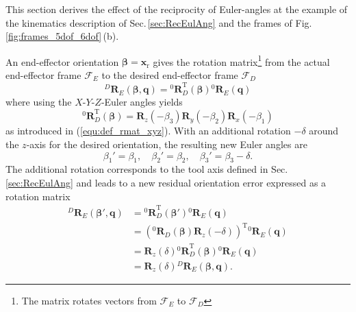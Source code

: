 \documentclass[robotics,article,submit,moreauthors,pdftex]{Definitions/mdpi}
\newcommand{\bm}[1]{\boldsymbol{#1}}
\newcommand{\rotmat}[2]{{{ }^{#1}\boldsymbol{R}}_{#2}}
\newcommand{\transp}[0]{{\mathrm{T}}}
\newcommand{\ks}[1]{{\mathcal{F}}_{#1}}
\begin{document}
This section derives the effect of the reciprocity of Euler-angles at the example of the kinematics description of Sec.\,\ref{sec:RecEulAng} and the frames of Fig.\,\ref{fig:frames_5dof_6dof}\,(b).

An end-effector orientation $\bm{\beta}=\bm{x}_{\mathrm{r}}$ gives the rotation matrix\footnote{The matrix rotates vectors from $\ks{E}$ to $\ks{D}$} from the actual end-effector frame $\ks{E}$ to the desired end-effector frame $\ks{D}$
%
\begin{equation}
\rotmat{D}{E}(\bm{\beta},\bm{q})
= 
\rotmat{0}{D}^\transp (\bm{\beta})\rotmat{0}{E}(\bm{q})
\label{equ:orierr_1_rotmat}
\end{equation}
%
where using the $X$-$Y$-$Z$-Euler angles yields
%
\begin{equation}
\rotmat{0}{D}^\transp(\bm{\beta})
=
\bm{R}_z(-\beta_3) \bm{R}_y(-\beta_2) \bm{R}_x(-\beta_1)
\end{equation}
%
as introduced in (\ref{equ:def_rmat_xyz}).
With an additional rotation $-\delta$ around the $z$-axis for the desired orientation, the resulting new Euler angles are
%
\begin{equation}
\beta_1'=\beta_1,  \quad \beta_2'=\beta_2,  \quad \beta_3'=\beta_3-\delta.
\end{equation}
%
The additional rotation corresponds to the tool axis defined in Sec.\,\ref{sec:RecEulAng} %
and leads to a new residual orientation error expressed as a rotation matrix
%
\begin{align}
    \rotmat{D}{E}(\bm{\beta}',\bm{q})
    &=
    \rotmat{0}{D}^\transp (\bm{\beta}') \rotmat{0}{E}(\bm{q}) \nonumber\\
    &=
    \left(\rotmat{0}{D}(\bm{\beta})\bm{R}_z(-\delta)\right)^\transp \rotmat{0}{E}(\bm{q}) \nonumber \\
    &=
    \bm{R}_z(\delta) \rotmat{0}{D}^\transp (\bm{\beta}) \rotmat{0}{E}(\bm{q}) \nonumber \\
    &=
    \bm{R}_z(\delta) \rotmat{D}{E}(\bm{\beta},\bm{q}).
    \label{equ:orierr_2_rotmat}
\end{align}
\end{document}
